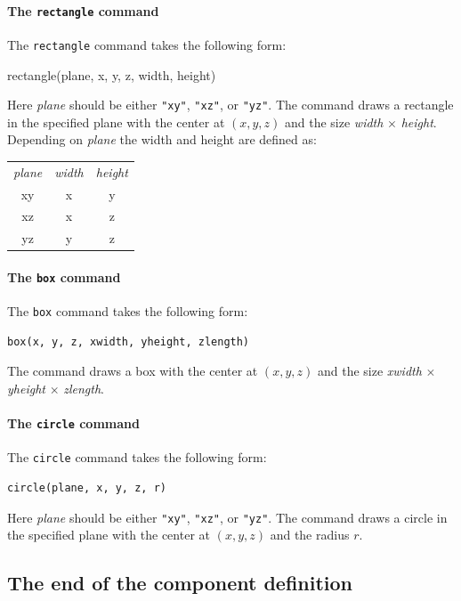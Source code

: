 \paragraph{The \texttt{rectangle} command}

The \texttt{rectangle} command takes the following form:
\begin{mcstas}
rectangle(plane, x, y, z, width, height)
\end{mcstas}
Here \textit{plane} should be either \verb+"xy"+, \verb+"xz"+, or
\verb+"yz"+. The command draws a rectangle in the specified plane with
the center at $(x, y, z)$ and the size \textit{width} $\times$
\textit{height}.
Depending on \textit{plane} the width and height are defined as:\\
\begin{tabular} {ccc}
  \textit{plane} & \textit{width} & \textit{height} \\
  xy & x & y \\
  xz & x & z \\
  yz & y & z \\
 \end{tabular}

\paragraph{The \texttt{box} command}

The \texttt{box} command takes the following form:
\begin{lstlisting}
box(x, y, z, xwidth, yheight, zlength)
\end{lstlisting}
The command draws a box with the center at $(x, y, z)$ and the size \textit{xwidth} $\times$ \textit{yheight} $\times$ \textit{zlength}.

\paragraph{The \texttt{circle} command}

The \texttt{circle} command takes the following form:
\begin{lstlisting}
circle(plane, x, y, z, r)
\end{lstlisting}
Here \textit{plane} should be either \verb+"xy"+, \verb+"xz"+, or
\verb+"yz"+. The command draws a circle in the specified plane with the center
 at $(x, y, z)$ and the radius $r$.



\subsection{The end of the component definition}

